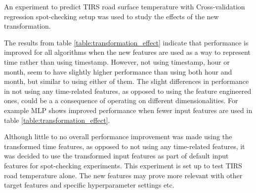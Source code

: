 	An experiment to predict TIRS road surface temperature with Cross-validation regression spot-checking setup was used to study the effects of the new transformation.

	\begin{table}[H] %
	\centering
	\caption{Experiment to see the effects of transforming the timestamp feature to two new features: month and hour. }
	\end{table}

	The results from table \ref{table:transformation_effect} indicate that performance is improved for all algorithms when the new features are used as a way to represent time rather than using timestamp. However, not using timestamp, hour or month, seem to have slightly higher performance than using both hour and month, but similar to using either of them. The slight differences in performance in not using any time-related features, as opposed to using the feature engineered ones, could be a a consequence of operating on different dimensionalities. For example MLP shows improved performance when fewer input features are used in table \ref{table:transformation_effect}. 

Although little to no overall performance improvement was made using the transformed time features, as opposed to not using any time-related features, it was decided to use the transformed input features as part of default input features for spot-checking experiments. This experiment is set up to test TIRS road temperature alone. The new features may prove more relevant with other target features and specific hyperparameter settings etc.


